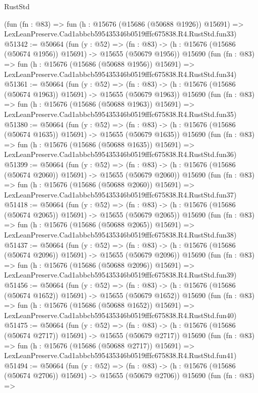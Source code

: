 \begin{lexlean}{RustStd}
\begin{coremodule}
    (fun (fn : @83) =>
    fun (h : @15676 (@15686 (@50688 @1926)) @15691) =>
    LexLeanPreserve.Cad1abbcb595435346b0519fffc675838.R4.RustStd.fun33)
@51342 := @50664
    (fun (y : @52) =>
    (fn : @83) -> (h : @15676 (@15686 (@50674 @1956)) @15691) -> @15655 (@50679 @1956))
    @15690
    (fun (fn : @83) =>
    fun (h : @15676 (@15686 (@50688 @1956)) @15691) =>
    LexLeanPreserve.Cad1abbcb595435346b0519fffc675838.R4.RustStd.fun34)
@51361 := @50664
    (fun (y : @52) =>
    (fn : @83) -> (h : @15676 (@15686 (@50674 @1963)) @15691) -> @15655 (@50679 @1963))
    @15690
    (fun (fn : @83) =>
    fun (h : @15676 (@15686 (@50688 @1963)) @15691) =>
    LexLeanPreserve.Cad1abbcb595435346b0519fffc675838.R4.RustStd.fun35)
@51380 := @50664
    (fun (y : @52) =>
    (fn : @83) -> (h : @15676 (@15686 (@50674 @1635)) @15691) -> @15655 (@50679 @1635))
    @15690
    (fun (fn : @83) =>
    fun (h : @15676 (@15686 (@50688 @1635)) @15691) =>
    LexLeanPreserve.Cad1abbcb595435346b0519fffc675838.R4.RustStd.fun36)
@51399 := @50664
    (fun (y : @52) =>
    (fn : @83) -> (h : @15676 (@15686 (@50674 @2060)) @15691) -> @15655 (@50679 @2060))
    @15690
    (fun (fn : @83) =>
    fun (h : @15676 (@15686 (@50688 @2060)) @15691) =>
    LexLeanPreserve.Cad1abbcb595435346b0519fffc675838.R4.RustStd.fun37)
@51418 := @50664
    (fun (y : @52) =>
    (fn : @83) -> (h : @15676 (@15686 (@50674 @2065)) @15691) -> @15655 (@50679 @2065))
    @15690
    (fun (fn : @83) =>
    fun (h : @15676 (@15686 (@50688 @2065)) @15691) =>
    LexLeanPreserve.Cad1abbcb595435346b0519fffc675838.R4.RustStd.fun38)
@51437 := @50664
    (fun (y : @52) =>
    (fn : @83) -> (h : @15676 (@15686 (@50674 @2096)) @15691) -> @15655 (@50679 @2096))
    @15690
    (fun (fn : @83) =>
    fun (h : @15676 (@15686 (@50688 @2096)) @15691) =>
    LexLeanPreserve.Cad1abbcb595435346b0519fffc675838.R4.RustStd.fun39)
@51456 := @50664
    (fun (y : @52) =>
    (fn : @83) -> (h : @15676 (@15686 (@50674 @1652)) @15691) -> @15655 (@50679 @1652))
    @15690
    (fun (fn : @83) =>
    fun (h : @15676 (@15686 (@50688 @1652)) @15691) =>
    LexLeanPreserve.Cad1abbcb595435346b0519fffc675838.R4.RustStd.fun40)
@51475 := @50664
    (fun (y : @52) =>
    (fn : @83) -> (h : @15676 (@15686 (@50674 @2717)) @15691) -> @15655 (@50679 @2717))
    @15690
    (fun (fn : @83) =>
    fun (h : @15676 (@15686 (@50688 @2717)) @15691) =>
    LexLeanPreserve.Cad1abbcb595435346b0519fffc675838.R4.RustStd.fun41)
@51494 := @50664
    (fun (y : @52) =>
    (fn : @83) -> (h : @15676 (@15686 (@50674 @2706)) @15691) -> @15655 (@50679 @2706))
    @15690
    (fun (fn : @83) =>

\end{coremodule}
\end{lexlean}
